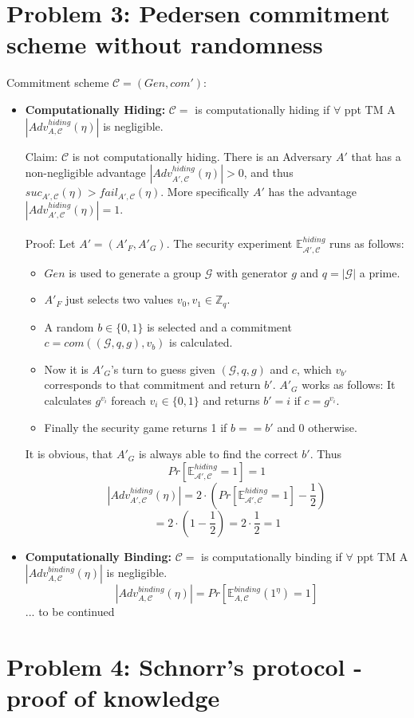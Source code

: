 \documentclass[12pt,pdftex,a4paper]{article}
\begin{document}
\section*{Problem 3: Pedersen commitment scheme without randomness}
Commitment scheme $\mathcal{C} = (Gen, com')$:
\begin{itemize}
\item \textbf{Computationally Hiding:} 
$\mathcal{C} =$ is computationally hiding if $\forall$ ppt TM A $|Adv_{A,\mathcal{C}}^{hiding}(\eta)|$ is negligible.

Claim: $\mathcal{C}$ is not computationally hiding. There is an Adversary $A'$ that has a non-negligible advantage $|Adv_{A',\mathcal{C}}^{hiding}(\eta)|>0$, and thus $suc_{A',\mathcal{C}}(\eta) > fail_{A',\mathcal{C}}(\eta)$. More specifically $A'$ has the advantage $|Adv_{A',\mathcal{C}}^{hiding}(\eta)|=1$.
\\~\\
Proof: Let $A' = (A'_F, A'_G)$. The security experiment $\mathbb{E}_{\mathcal{A',C}}^{hiding}$ runs as follows:
\begin{itemize}
\item $Gen$ is used to generate a group $\mathcal{G}$ with generator $g$ and $q = |\mathcal{G}|$ a prime.
\item $A'_F$ just selects two values $v_0, v_1 \in \mathbb{Z}_q$.
\item A random $b\in \{0,1\}$ is selected and a commitment $c = com((\mathcal{G}, q, g), v_b)$ is calculated.
\item Now it is $A'_G$'s turn to guess given $(\mathcal{G}, q, g)$ and $c$, which $v_{b'}$ corresponds to that commitment and return $b'$. $A'_G$ works as follows: It calculates $g^{v_i}$ foreach $v_i\in \{0, 1\}$ and returns $b' = i$ if $c = g^{v_i}$.
\item Finally the security game returns 1 if $b==b'$ and 0 otherwise.
\end{itemize}

It is obvious, that $A'_G$ is always able to find the correct $b'$. Thus $$Pr[\mathbb{E}_{\mathcal{A',C}}^{hiding} = 1] = 1$$
$$|Adv_{A',\mathcal{C}}^{hiding}(\eta)| = 2 \cdot (Pr[\mathbb{E}_{\mathcal{A',C}}^{hiding} = 1] - \frac{1}{2})$$
$$= 2\cdot(1-\frac{1}{2})=2\cdot\frac{1}{2}=1$$

\item \textbf{Computationally Binding:}
$\mathcal{C} =$ is computationally binding if $\forall$ ppt TM A $|Adv_{A,\mathcal{C}}^{binding}(\eta)|$ is negligible.
$$|Adv_{A,\mathcal{C}}^{binding}(\eta)| = Pr[\mathbb{E}_{A,\mathcal{C}}^{binding}(1^{\eta})=1]$$
... to be continued
\end{itemize}

\section*{Problem 4: Schnorr’s protocol - proof of knowledge}
\end{document}
